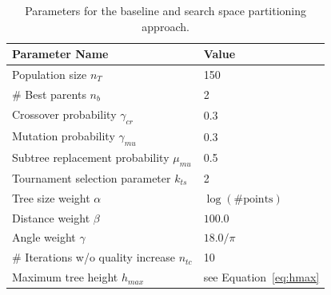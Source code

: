 \begin{table}[h]
	\centering
	\begin{tabular}{|l|l|}
		\hline
		\textbf{Parameter Name} & \textbf{Value}  \\
		\hline
		Population size $n_T$ & 150 \\
		\hline
		\# Best parents $n_b$ & 2 \\
		\hline
		Crossover probability $\gamma_{cr}$& 0.3 \\
		\hline
		Mutation probability $\gamma_{mu}$& 0.3 \\
		\hline
		Subtree replacement probability $\mu_{mu}$& 0.5 \\
		\hline
		Tournament selection parameter $k_{ts}$ & 2\\
		\hline
		Tree size weight $\alpha$& $\log(\text{\#points})$\\
		\hline
		Distance weight $\beta$& $100.0$ \\
		\hline
		Angle weight $\gamma$& $18.0/\pi$ \\
		\hline 
		\# Iterations w/o quality increase $n_{tc}$ & 10 \\
		\hline 
		Maximum tree height $h_{max}$ & see Equation~\ref{eq:hmax} \\
		\hline 
	\end{tabular}
	\caption{Parameters for the baseline and search space partitioning approach.}
	\label{tab:gaparams}
\end{table}   
